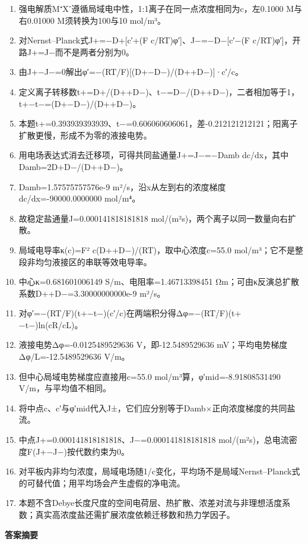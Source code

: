 \documentclass[UTF8,11pt,a4paper]{ctexart}
\begin{document}
\begin{enumerate}
\item 强电解质M⁺X⁻遵循局域电中性，1:1离子在同一点浓度相同为c，左0.1000 M与右0.01000 M须转换为100与10 mol/m³。
\item 对Nernst–Planck式J+=−D+[c′+(F c/RT)φ′]、J−=−D−[c′−(F c/RT)φ′]，开路J+=J−而不是两者分别为0。
\item 由J+−J−=0解出φ′=−(RT/F)[(D+−D−)/(D++D−)]·c′/c。
\item 定义离子转移数t+=D+/(D++D−)、t−=D−/(D++D−)，二者相加等于1，t+−t−=(D+−D−)/(D++D−)。
\item 本题t+=0.393939393939、t−=0.606060606061，差-0.212121212121；阳离子扩散更慢，形成不为零的液接电势。
\item 用电场表达式消去迁移项，可得共同盐通量J+=J−=−Damb dc/dx，其中Damb=2D+D−/(D++D−)。
\item Damb=1.57575757576e-9 m²/s，沿x从左到右的浓度梯度dc/dx=-90000.0000000 mol/m⁴。
\item 故稳定盐通量J=0.000141818181818 mol/(m²s)，两个离子以同一数量向右扩散。
\item 局域电导率κ(c)=F² c(D++D−)/(RT)，取中心浓度c=55.0 mol/m³；它不是整段非均匀液接区的串联等效电导率。
\item 中心κ=0.681601006149 S/m、电阻率=1.46713398451 Ωm；可由κ反演总扩散系数D++D−=3.30000000000e-9 m²/s。
\item 对φ′=−(RT/F)(t+−t−)(c′/c)在两端积分得Δφ=−(RT/F)(t+−t−)ln(cR/cL)。
\item 液接电势Δφ=-0.0125489529636 V，即-12.5489529636 mV；平均电势梯度Δφ/L=-12.5489529636 V/m。
\item 但中心局域电势梯度应直接用c=55.0 mol/m³算，φ′mid=-8.91808531490 V/m，与平均值不相同。
\item 将中点c、c′与φ′mid代入J±，它们应分别等于Damb×正向浓度梯度的共同盐流。
\item 中点J+=0.000141818181818、J−=0.000141818181818 mol/(m²s)，总电流密度F(J+−J−)按代数约束为0。
\item 对平板内非均匀浓度，局域电场随1/c变化，平均场不是局域Nernst–Planck式的可替代值；用平均场会产生虚假的净电流。
\item 本题不含Debye长度尺度的空间电荷层、热扩散、浓差对流与非理想活度系数；真实高浓度盐还需扩展浓度依赖迁移数和热力学因子。
\end{enumerate}
\noindent\textbf{答案摘要}\par
\end{document}
